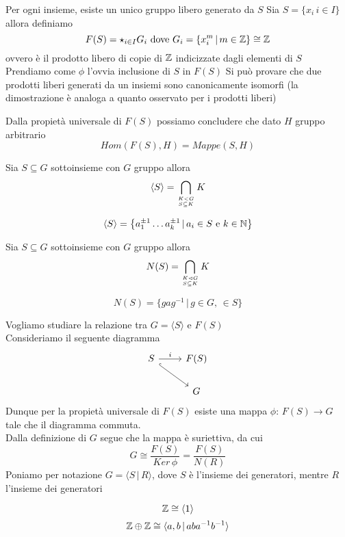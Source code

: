 \begin{prop}Per ogni insieme, esiste un unico gruppo libero generato da $S$
\proof
Sia $S=\{ x_i \, i\in I\}$ allora definiamo
$$ F(S)= \star_{i\in I } G_i \text{ dove } G_i = \{ x_i^m \, \vert \, m \in \mathbb{Z}\}\cong\mathbb{Z}$$
ovvero \`e il prodotto libero di copie di $\mathbb{Z}$ indicizzate dagli elementi di $S$\\
Prendiamo come $\phi$ l'ovvia inclusione di $S$ in $F(S)$
Si pu\`o provare che due prodotti liberi generati da un insiemi sono canonicamente isomorfi (la dimostrazione \`e analoga a quanto osservato per i prodotti liberi)
\end{prop}
\begin{oss}Dalla propiet\`a universale di $F(S)$ possiamo concludere che dato $H$ gruppo arbitrario 
$$ Hom(F(S),H)=Mappe(S,H)$$
\end{oss}
\newpage
\begin{defn}\bianco
Sia $S\subseteq G$ sottoinsieme con $G$ gruppo allora
$$ \langle S\rangle =\bigcap_{{K < G}\atop{S\subseteq K}}K$$
\begin{oss}
$$\langle S \rangle=\left\{ a_1^{\pm 1} \dots a_k^{\pm 1} \, \vert \, a_i \in S \text{ e } k \in \mathbb{N}\right\}$$
\end{oss}
\end{defn}
\begin{defn}\bianco
Sia $S\subseteq G$ sottoinsieme con $G$ gruppo allora
$$N(S)=\bigcap_{{K\lhd G}\atop{S\subseteq K}}K$$
\begin{oss}
$$N(S)= \{ g a g^{-1}  \, \vert \, g \in G ,\, \in S\}$$
\end{oss}
\end{defn}
\begin{oss}Vogliamo studiare la relazione tra $G=\langle S \rangle$ e $F(S)$\\
Consideriamo il seguente diagramma
$$\begin{tikzcd} S \arrow[r,"i"]  \arrow[hook,rd]& F(S) \\ &  G
\end{tikzcd}$$
Dunque per la propiet\`a universale di $F(S)$ esiste una mappa $\phi:\, F(S) \to G$ tale che il diagramma commuta.\\
Dalla definizione di $G$ segue che la mappa \`e suriettiva, da cui 
$$ G \cong \frac{F(S)}{Ker \, \phi} =\frac{F(S)}{N(R)}$$ 
Poniamo per notazione $G=\langle S \, \vert \, R \rangle$, dove $S$ \`e l'insieme dei generatori, mentre $R$ l'insieme dei generatori
\end{oss}
\begin{ese}$$\mathbb{Z} \cong \langle 1 \rangle$$
$$\mathbb{Z}\oplus \mathbb{Z} \cong \langle a, b \, \vert \, ab a^{-1}b^{-1}\rangle$$

\end{ese}
